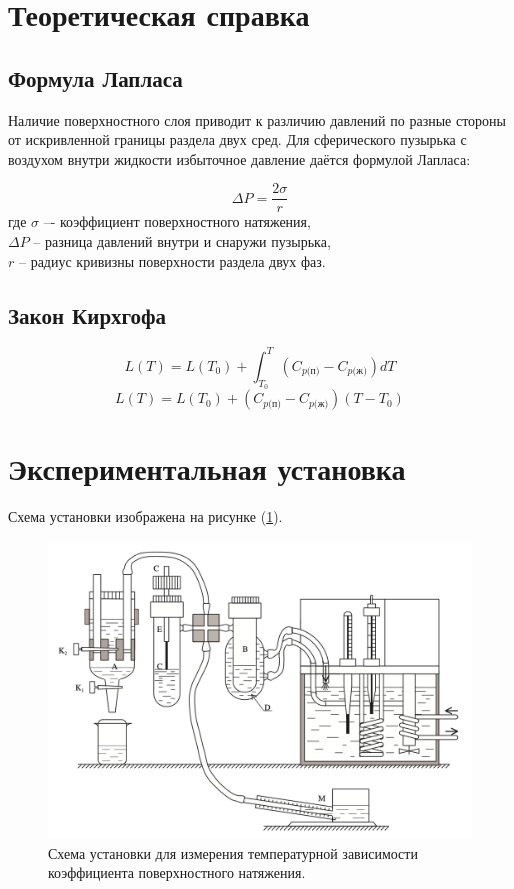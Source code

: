 \documentclass[a4paper,12pt]{article} %
\begin{document}
\section*{Теоретическая справка}

\subsection*{Формула Лапласа}

Наличие поверхностного слоя приводит к различию давлений по разные стороны от искривленной границы раздела двух сред. Для сферического пузырька с воздухом внутри жидкости избыточное давление даётся формулой Лапласа:

\[
  \Delta P = \frac{2\sigma}{r} 
\]
где $\sigma$ –- коэффициент поверхностного натяжения, \\
$\Delta P$ – разница давлений внутри и снаружи пузырька, \\
$r$ – радиус кривизны поверхности раздела двух фаз. 

\subsection*{Закон Кирхгофа}

\[
  L(T) = L(T_0) + \int_{T_0}^{T}(C_{p \text{(п)}} - C_{p \text{(ж)}}) dT 
\]
\[
  L(T) = L(T_0) + (C_{p \text{(п)}} - C_{p \text{(ж)}}) (T - T_0)
\]



\section*{Экспериментальная установка} 

Схема установки изображена на рисунке (\ref{fig:setup}). 

\begin{figure}[h!]
  \centering
  \includegraphics[scale = 0.75]{setup.png}
  \caption{Схема установки для измерения температурной зависимости коэффициента поверхностного натяжения.}
  \label{fig:setup}
\end{figure}
\end{document}
